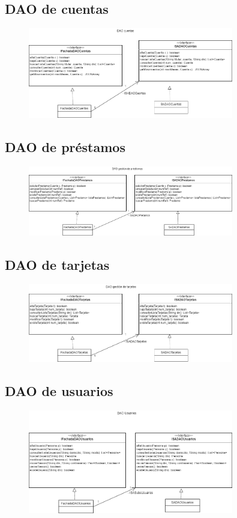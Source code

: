 \documentclass[12pt]{article}
\begin{document}
\subsection{DAO de cuentas}
\begin{figure}[H]
    \centering
    \includegraphics[width=0.8\textwidth]{images/DAOCuentas.png}
\end{figure}
\subsection{DAO de préstamos}
\begin{figure}[H]
    \centering
    \includegraphics[width=0.8\textwidth]{images/DAOPrestamos.png}
\end{figure}
\subsection{DAO de tarjetas}
\begin{figure}[H]
    \centering
    \includegraphics[width=0.8\textwidth]{images/DAOTarjeta.png}
\end{figure}
\subsection{DAO de usuarios}
\begin{figure}[H]
    \centering
    \includegraphics[width=0.8\textwidth]{images/DAOUsuarios.png}
\end{figure}
\end{document}
